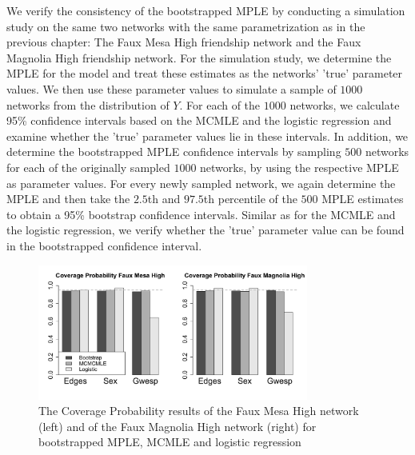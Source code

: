 \documentclass[10pt, conference, compsocconf]{IEEEtran}
\begin{document}
\noindent We verify the consistency of the bootstrapped MPLE by conducting a simulation study on the same two networks with the same parametrization as in the previous chapter: The Faux Mesa High friendship network and the Faux Magnolia High friendship network. For the simulation study, we determine the MPLE for the model and treat these estimates as the networks' 'true' parameter values. We then use these parameter values to simulate a sample of $1000$ networks from the distribution of $Y$. For each of the $1000$ networks, we calculate 95\% confidence intervals based on the MCMLE and the logistic regression and examine whether the 'true' parameter values lie in these intervals. In addition, we determine the bootstrapped MPLE confidence intervals by sampling $500$ networks for each of the originally sampled $1000$ networks, by using the respective MPLE as parameter values. For every newly sampled network, we again determine the MPLE and then take the $2.5$th and $97.5$th percentile of the $500$ MPLE estimates to obtain a 95\% bootstrap confidence intervals. Similar as for the MCMLE and the logistic regression, we verify whether the 'true' parameter value can be found in the bootstrapped confidence interval. 
\begin{figure}[!t]
\centering
\includegraphics[width=3.5in]{Coverage_Mesa_Magnolia_height05}
\caption{The Coverage Probability results of the Faux Mesa High network (left) and of the Faux Magnolia High network (right) for bootstrapped MPLE, MCMLE and logistic regression}
\label{coverage}
\end{figure}
\end{document}
